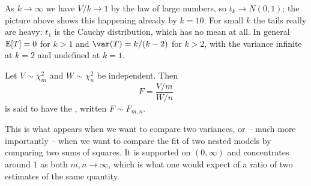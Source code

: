 \documentclass[a4paper]{scrartcl}
\begin{document}
As $k \to \infty$ we have $V/k \to 1$ by the law of large numbers, so $t_k \to N(0,1)$; the picture above shows this happening already by $k = 10$. For small $k$ the tails really are heavy: $t_1$ is the Cauchy distribution, which has no mean at all. In general $\mathbb{E}[T] = 0$ for $k > 1$ and $\var(T) = k/(k-2)$ for $k > 2$, with the variance infinite at $k = 2$ and undefined at $k=1$.

\begin{definition}[$F$-Distribution]
  Let $V \sim \chi^2_m$ and $W \sim \chi^2_n$ be independent. Then
  $$
  F = \frac{V/m}{W/n}
  $$
  is said to have the , written $F \sim F_{m,n}$.
\end{definition}

This is what appears when we want to compare two variances, or -- much more importantly -- when we want to compare the fit of two nested models by comparing two sums of squares. It is supported on $(0, \infty)$ and concentrates around $1$ as both $m, n \to \infty$, which is what one would expect of a ratio of two estimates of the same quantity.
\end{document}
